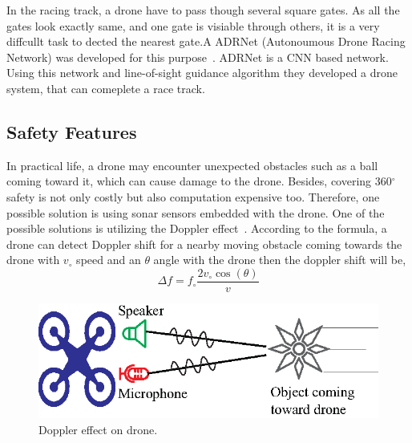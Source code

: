 In the racing track, a drone have to pass though several square gates. As all the gates look exactly same, and one gate is visiable through others, it is a very diffcullt task to dected the nearest gate.A ADRNet (Autonoumous Drone Racing Network) was developed for this purpose~\cite{jung2018perception}. ADRNet  is a CNN based network. Using this network and line-of-sight guidance algorithm they developed a drone system, that can comeplete a race track. 

\subsection{Safety Features}
In practical life, a drone may encounter unexpected obstacles such as a ball coming toward it, which can cause damage to the drone. Besides, covering 360$^{\circ}$ safety is not only costly but also computation expensive too. Therefore, one possible solution is using sonar sensors embedded with the drone. One of the possible solutions is utilizing the Doppler effect~\cite{garg2020enabling}. According to the formula, a drone can detect Doppler shift for a nearby moving obstacle coming towards the drone with $v_{\circ}$ speed and an $\theta$ angle with the drone then the doppler shift will be, $$\Delta f=f_{\circ} \frac{2 v_{\circ} \cos (\theta)}{v}$$ 




\begin{figure}[h!]
\centering
\includegraphics[width=.8\linewidth]{figure/safety.eps}
\caption{Doppler effect on drone.}
\label{safety}
\end{figure}


